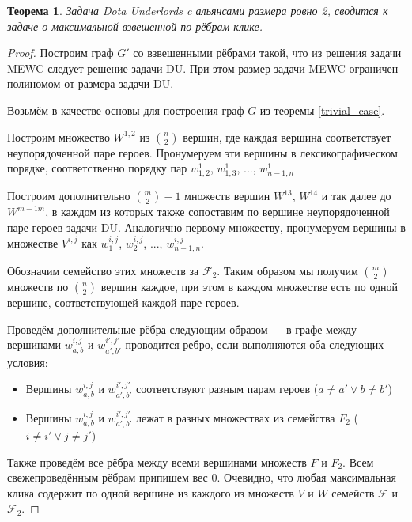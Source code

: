 \documentclass{article}
\newtheorem{theorem}{Теорема}
\begin{document}
\begin{theorem}
\label{second_case}
    Задача Dota Underlords c альянсами размера ровно 2, сводится к задаче о максимальной взвешенной по рёбрам клике.
\end{theorem}

\begin{proof}
    Построим граф $G'$ со взвешенными рёбрами такой, что из решения задачи MEWC следует решение задачи DU. При этом размер задачи MEWC ограничен полиномом от размера задачи DU.
    
    Возьмём в качестве основы для построения граф $G$ из теоремы \ref{trivial_case}.
    
    Построим множество $W^{1,2}$ из $\binom{n}{2}$ вершин, где каждая вершина соответствует неупорядоченной паре героев. Пронумеруем эти вершины в лексикографическом порядке, соответственно порядку пар $w_{1,2}^1$, $w_{1,3}^1$, ..., $w_{n-1,n}^1$
    
    Построим дополнительно $\binom{m}{2}-1$ множеств вершин $W^{13}$, $W^{14}$ и так далее до $W^{m-1 m}$, в каждом из которых также сопоставим по вершине неупорядоченной паре героев задачи DU. Аналогично первому множеству, пронумеруем вершины в множестве $V^{i,j}$ как $w_1^{i,j}$, $w_2^{i,j}$, ..., $w_{n-1,n}^{i,j}$.
    
    Обозначим семейство этих множеств за $\mathcal{F}_2$. Таким образом мы получим $\binom{m}{2}$ множеств по $\binom{n}{2}$ вершин каждое, при этом в каждом множестве есть по одной вершине, соответствующей каждой паре героев.
    
    Проведём дополнительные рёбра следующим образом --- в графе между вершинами $w_{a,b}^{i,j}$ и $w_{a',b'}^{i',j'}$ проводится ребро, если выполняются оба следующих условия:
    \begin{itemize}
        \item Вершины $w_{a,b}^{i,j}$ и $w_{a',b'}^{i', j'}$ соответствуют разным парам героев ($a \neq a' \lor b \neq b'$)
        \item Вершины $w_{a,b}^{i,j}$ и $w_{a',b'}^{i', j'}$ лежат в разных множествах из семейства $F_2$ ($i \neq i' \lor j \neq j'$)
    \end{itemize}
    
    Также проведём все рёбра между всеми вершинами множеств $F$ и $F_2$. Всем свежепроведённым рёбрам припишем вес 0. Очевидно, что любая максимальная клика содержит по одной вершине из каждого из множеств $V$ и $W$ семейств $\mathcal{F}$ и $\mathcal{F}_2$. 
    

\end{proof}
\end{document}
